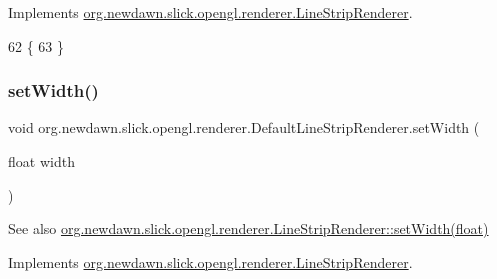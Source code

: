 Implements \mbox{\hyperlink{interfaceorg_1_1newdawn_1_1slick_1_1opengl_1_1renderer_1_1_line_strip_renderer_ac2c299158c60d76e8745759dd2dc8633}{org.\+newdawn.\+slick.\+opengl.\+renderer.\+Line\+Strip\+Renderer}}.


\begin{DoxyCode}
62                                           \{
63     \}
\end{DoxyCode}
\mbox{\label{classorg_1_1newdawn_1_1slick_1_1opengl_1_1renderer_1_1_default_line_strip_renderer_a0e31016a63b0166c556eb10309fd4603}} 
\subsubsection{\texorpdfstring{set\+Width()}{setWidth()}}
{\footnotesize\ttfamily void org.\+newdawn.\+slick.\+opengl.\+renderer.\+Default\+Line\+Strip\+Renderer.\+set\+Width (\begin{DoxyParamCaption}\item[{float}]{width }\end{DoxyParamCaption})\hspace{0.3cm}{\ttfamily [inline]}}

\begin{DoxySeeAlso}{See also}
\mbox{\hyperlink{interfaceorg_1_1newdawn_1_1slick_1_1opengl_1_1renderer_1_1_line_strip_renderer_afc8159c0766c0d177b402cf311d9a7b8}{org.\+newdawn.\+slick.\+opengl.\+renderer.\+Line\+Strip\+Renderer\+::set\+Width(float)}} 
\end{DoxySeeAlso}


Implements \mbox{\hyperlink{interfaceorg_1_1newdawn_1_1slick_1_1opengl_1_1renderer_1_1_line_strip_renderer_afc8159c0766c0d177b402cf311d9a7b8}{org.\+newdawn.\+slick.\+opengl.\+renderer.\+Line\+Strip\+Renderer}}.



